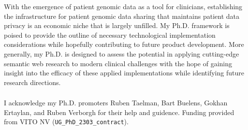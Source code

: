 \documentclass[runningheads]{llncs}
\begin{document}
With the emergence of patient genomic data as a tool for clinicians, establishing the infrastructure for patient genomic data sharing that maintains patient data privacy is an economic niche that is largely unfilled. 
My Ph.D. framework is poised to provide the outline of necessary technological implementation considerations while hopefully contributing to future product development. 
More generally, my Ph.D. is designed to assess the potential in applying cutting-edge semantic web research to modern clinical challenges with the hope of gaining insight into the efficacy of these applied implementations while identifying future research directions.



\subsubsection{\ackname} 
I acknowledge my Ph.D. promoters Ruben Taelman, Bart Buelens, Gokhan Ertaylan, and Ruben Verborgh for their help and guidence.
Funding provided from VITO NV (\verb|UG_PhD_2303_contract|). 



\end{document}
